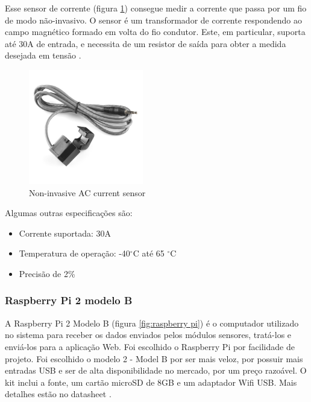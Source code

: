 Esse sensor de corrente (figura \ref{fig:sensor}) consegue medir a corrente que passa por um fio de modo não-invasivo. O sensor é um transformador de corrente respondendo ao campo magnético formado em volta do fio condutor. Este, em particular, suporta até 30A de entrada, e necessita de um resistor de saída para obter a medida desejada em tensão \cite{non_invasive_sensor}.

\begin{figure}[H]
\begin{center}
\includegraphics[width=5cm,height=5cm,keepaspectratio]{figuras/sensor.jpg}
\caption{\label{fig:sensor} Non-invasive AC current sensor}
\end{center}
\end{figure}

Algumas outras especificações são:
\begin{itemize}
\item{Corrente suportada: 30A}
\item{Temperatura de operação: -40$^{\circ}$C até 65 $^{\circ}$C}
\item{Precisão de 2\%}
\end{itemize}
%
\subsubsection{Raspberry Pi 2 modelo B}

A Raspberry Pi 2 Modelo B (figura \ref{fig:raspberry pi}) é o computador utilizado no sistema para receber os dados enviados pelos módulos sensores, tratá-los e enviá-los para a aplicação Web. Foi escolhido o Raspberry Pi por facilidade de projeto. Foi escolhido o modelo 2 - Model B por ser mais veloz, por possuir mais entradas USB e ser de alta disponibilidade no mercado, por um preço razoável. O kit inclui a fonte, um cartão microSD de 8GB e um adaptador Wifi USB. Mais detalhes estão no datasheet \cite{raspberry_datasheet}.

